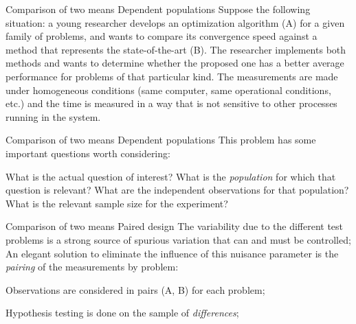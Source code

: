 \documentclass[t]{beamer}
\begin{document}

\begin{ftst}
{Comparison of two means}
{Dependent populations}
Suppose the following situation: a young researcher develops an optimization algorithm (A) for a given family of problems, and wants to compare its convergence speed against a method that represents the state-of-the-art (B).
\vone
The researcher implements both methods and wants to determine whether the proposed one has a better average performance for problems of that particular kind.
\vone
The measurements are made under homogeneous conditions (same computer, same operational conditions, etc.) and the time is measured in a way that is not sensitive to other processes running in the system.
\vone
{}
\end{ftst}


\begin{ftst}
{Comparison of two means}
{Dependent populations}
This problem has some important questions worth considering:

\bitems What is the actual question of interest?
\spitem What is the \textit{population} for which that question is relevant?
\spitem What are the independent observations for that population?
\spitem What is the relevant sample size for the experiment?
\eitem
\end{ftst}


\begin{ftst}
{Comparison of two means}
{Paired design}
The variability due to the different test problems is a strong source of spurious variation that can and must be controlled;
\vone
An elegant solution to eliminate the influence of this nuisance parameter is the \textit{pairing} of the measurements by problem:

\bitems Observations are considered in pairs (A, B) for each problem; 
\item Hypothesis testing is done on the sample of \textit{differences};
\eitem
\end{ftst}
\end{document}

